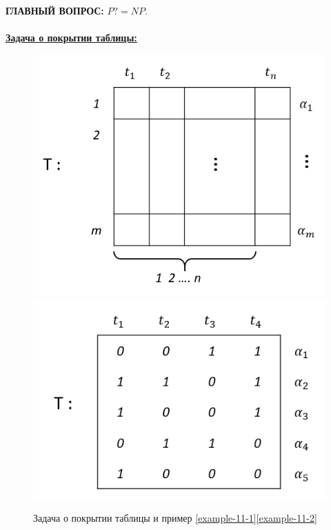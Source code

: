 \documentclass{article}
\numberwithin{example}{section}
\numberwithin{question}{section}
\numberwithin{Remark}{section}
\numberwithin{theorem}{section}
\numberwithin{definition}{section}
\numberwithin{proposition}{section}
\begin{document}
\textbf{ГЛАВНЫЙ ВОПРОС:} $P?=NP$.\\
\\
\underline{\textbf{Задача о покрытии таблицы:}}
\begin{figure}[!htp]
	\centering
	\includegraphics[width=0.4\linewidth]{11-5}
	\includegraphics[width=0.4\linewidth]{11-6}
	\caption{Задача о покрытии таблицы и пример \ref{example-11-1}\ref{example-11-2}}
	\label{fig:11-5}
\end{figure}
\end{document}
